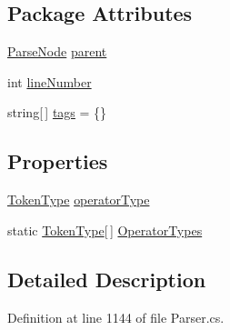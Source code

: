 \subsection*{Package Attributes}
\begin{DoxyCompactItemize}
\item 
\hyperlink{a00142}{Parse\-Node} \hyperlink{a00142_af313a82103fcc2ff5a177dbb06b92f7b}{parent}
\item 
int \hyperlink{a00142_a18b493382de0fde5b4299c1bd2250075}{line\-Number}
\item 
string\mbox{[}$\,$\mbox{]} \hyperlink{a00142_a58b3a15788fd2d4127d73619dc6d04ae}{tags} = \{\}
\end{DoxyCompactItemize}
\subsection*{Properties}
\begin{DoxyCompactItemize}
\item 
\hyperlink{a00045_a301aa7c866593a5b625a8fc158bbeace}{Token\-Type} \hyperlink{a00137_ac2de2f59be0e69b316627a4de16fadd3}{operator\-Type}
\item 
static \hyperlink{a00045_a301aa7c866593a5b625a8fc158bbeace}{Token\-Type}\mbox{[}$\,$\mbox{]} \hyperlink{a00137_ad8a4bb1b46dbc3d1b7708e78a2d97e1c}{Operator\-Types}
\end{DoxyCompactItemize}


\subsection{Detailed Description}


Definition at line 1144 of file Parser.\-cs.



